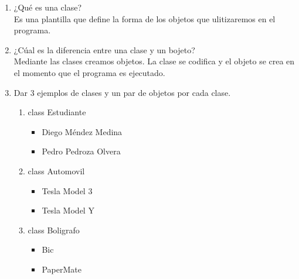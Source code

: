 \documentclass{article}
\begin{document}
\begin{enumerate}
\item ¿Qué es una clase? \\
Es una plantilla que define la forma de los objetos que ulitizaremos en el programa. \\
\item ¿Cúal es la diferencia entre una clase y un bojeto? \\
Mediante las clases creamos objetos. La clase se codifica y el objeto se crea en el momento que el programa es ejecutado. \\
\item Dar 3 ejemplos de  clases y un par de objetos por cada clase. \\
  \begin{enumerate}
  \item class Estudiante \\
    \begin{itemize}
    \item Diego Méndez Medina  \\
      \item Pedro Pedroza Olvera \\
      \end{itemize}      


     \item class Automovil  \\
    \begin{itemize}
    \item Tesla Model 3 \\
      \item Tesla Model Y \\
    \end{itemize}

     \item class Boligrafo \\
    \begin{itemize}
    \item Bic \\
      \item PaperMate \\
      \end{itemize}  
    \end{enumerate}
  

\end{enumerate}
\end{document}
